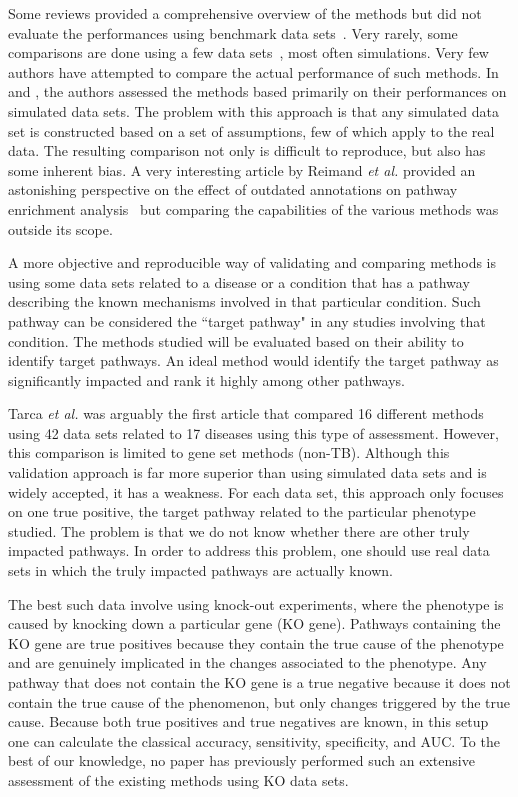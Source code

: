 Some reviews provided a comprehensive overview of the methods but did not evaluate the performances using benchmark data sets~\cite{mitrea2013methods, Khatri:2012}. 
%
Very rarely, some comparisons are done using a few data sets~\cite{bayerlova2015comparative}, most often simulations. 
Very few authors have attempted to compare the actual performance of such methods. 
In \cite{bayerlova2015comparative} and \cite{ihnatova2018critical}, the authors assessed the methods based primarily on their performances on simulated data sets.
The problem with this approach is that any simulated data set is constructed based on a set of assumptions, few of which apply to the real data. 
The resulting comparison not only is difficult to reproduce, but also has some inherent bias.
A very interesting article by Reimand \textit{et al.} provided an astonishing perspective on the effect of outdated annotations on pathway enrichment analysis~\cite{Wadi:2016} but comparing the capabilities of the various methods was outside its scope. 



A more objective and reproducible way of validating and comparing methods is using some data sets related to a disease or a condition that has a pathway describing the known mechanisms involved in that particular condition.
Such pathway can be considered the ``target pathway" in any studies involving that condition.
The methods studied will be evaluated based on their ability to identify target pathways. 
An ideal method would identify the target pathway as significantly impacted and rank it highly among other pathways.

Tarca \textit{et al.} \cite{tarca2013comparison} was arguably the first article that compared 16 different  methods using 42 data sets related to 17 diseases using this type of assessment. However, this comparison is limited to gene set methods (non-TB). 
Although this validation approach is far more superior than using simulated data sets and is widely accepted, it has a weakness. For each data set, this approach only focuses on one true positive, the target pathway related to the particular phenotype studied. The problem is that we do not know whether there are other truly impacted pathways. 
In order to address this problem, one should use real data sets in which the truly impacted pathways are actually known. 


The best such data involve using knock-out experiments, where the phenotype is caused by knocking down a particular gene (KO gene). Pathways containing the KO gene are true positives because they contain the true cause of the phenotype and are genuinely implicated in the changes associated to the phenotype. Any pathway that does not contain the KO gene is a true negative because it does not contain the true cause of the phenomenon, but only changes triggered by the true cause. Because both true positives and true negatives are known, in this setup one can calculate the classical  accuracy, sensitivity, specificity, and  AUC. To the best of our knowledge, no paper has previously performed such an extensive assessment of the existing methods using KO data sets.

